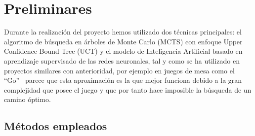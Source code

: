 \documentclass[conference,a4paper]{IEEEtran}
\begin{document}
\section{Preliminares}

Durante la realización del proyecto hemos utilizado dos técnicas principales:
el algoritmo de búsqueda en árboles de Monte Carlo (MCTS) con enfoque Upper Confidence 
Bound Tree (UCT) y el modelo de Inteligencia Artificial basado en aprendizaje supervisado 
de las redes neuronales, tal y como se ha utilizado en proyectos similares con anterioridad,
por ejemplo en juegos de mesa como el ``Go''~\cite{b10} parece que esta aproximación es 
la que mejor funciona debido a la gran complejidad que posee el juego y que por tanto hace
imposible la búsqueda de un camino óptimo.

\subsection{Métodos empleados}
\end{document}
